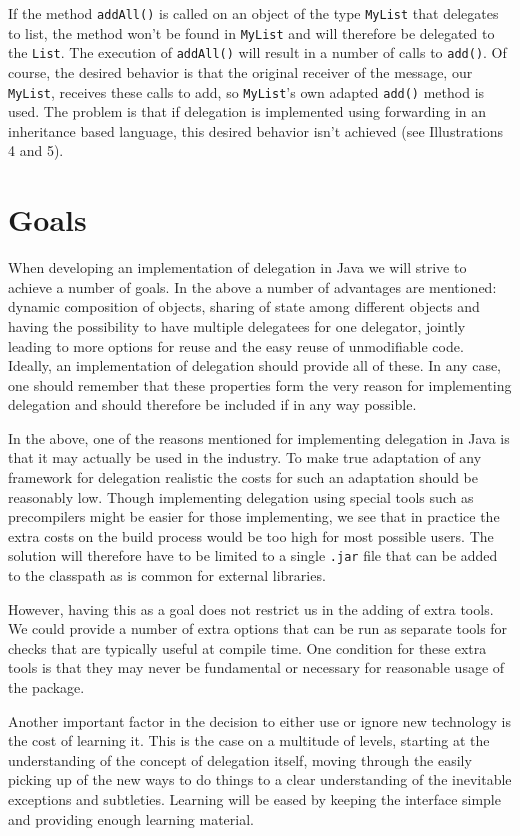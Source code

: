 \documentclass[a4paper,12pt]{book}
\begin{document}
If the method \verb|addAll()| is called on an object of the type \verb|MyList| that delegates to list, the method won't be found in \verb|MyList| and will therefore be delegated to the \verb|List|. The execution of \verb|addAll()| will result in a number of calls to \verb|add()|. Of course, the desired behavior is that the original receiver of the message, our \verb|MyList|, receives these calls to add, so \verb|MyList|'s own adapted \verb|add()| method is used. The problem is that if delegation is implemented using forwarding in an inheritance based language, this desired behavior isn't achieved (see Illustrations 4 and 5).

\section*{Goals}
When developing an implementation of delegation in Java we will strive to achieve a number of goals. In the above a number of advantages are mentioned: dynamic composition of objects, sharing of state among different objects and having the possibility to have multiple delegatees for one delegator, jointly leading to more options for reuse and the easy reuse of unmodifiable code. Ideally, an implementation of delegation should provide all of these. In any case, one should remember that these properties form the very reason for implementing delegation and should therefore be included if in any way possible.

In the above, one of the reasons mentioned for implementing delegation in Java is that it may actually be used in the industry. To make true adaptation of any framework for delegation realistic the costs for such an adaptation should be reasonably low. Though implementing delegation using special tools such as precompilers might be easier for those implementing, we see that in practice the extra costs on the build process would be too high for most possible users. The solution will therefore have to be limited to a single \verb|.jar| file that can be added to the classpath as is common for external libraries.

However, having this as a goal does not restrict us in the adding of extra tools. We could provide a number of extra options that can be run as separate tools for checks that are typically useful at compile time. One condition for these extra tools is that they may never be fundamental or necessary for reasonable usage of the package.

Another important factor in the decision to either use or ignore new technology is the cost of learning it. This is the case on a multitude of levels, starting at the understanding of the concept of delegation itself, moving through the easily picking up of the new ways to do things to a clear understanding of the inevitable exceptions and subtleties. Learning will be eased by keeping the interface simple and providing enough learning material.
\end{document}
